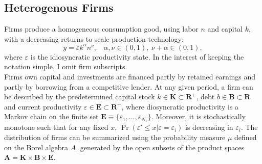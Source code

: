 \documentclass[12pt]{article}
\begin{document}
\subsection{Heterogenous Firms \label{sec:firms}}
Firms produce a homogeneous consumption good, using labor $n$ and capital $k$, with a decreasing returns to scale production technology:
\begin{equation} \label{eq:prodf}
y = \varepsilon k^{\alpha}n^{\nu}, \ \ \ \ \alpha,\nu \in (0,1),  \ \nu + \alpha \in (0,1),
\end{equation}  
where $\varepsilon$ is the idiosyncratic productivity state. In the interest of keeping the notation simple, I omit firm subscripts. \vspace{3mm} \\
Firms own capital and investments are financed partly by retained earnings and partly by borrowing from a competitive lender. At any given period, a firm can be described by the predetermined capital stock $k \in \mathbf{K} \subset \mathbf{R^{+}}$, debt $b \in \mathbf{B} \subset \mathbf{R}$ and current productivity $\varepsilon \in \mathbf{E} \subset \mathbf{R^+}$, where diosyncratic productivity is a Markov chain on the finite set $\mathbf{E} \equiv \{ \varepsilon_1,...,\varepsilon_{N_{\varepsilon}} \}$. Moreover, it is stochastically monotone such that for any fixed $x$, $\Pr(\varepsilon' \leq x | \varepsilon = \varepsilon_i)$ is decreasing in $\varepsilon_i$. The distribution of firms can be summarized using the probability measure $\mu$ defined on the Borel algebra $A$, generated by the open subsets of the product spaces $ \mathbf{A} = \mathbf{K} \times \mathbf{B} \times \mathbf{E} $.
\end{document}
